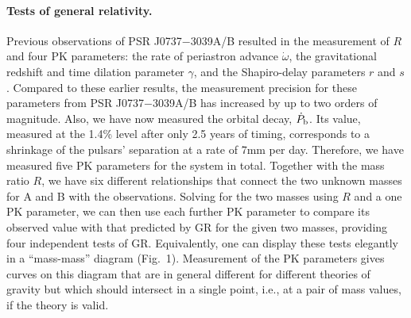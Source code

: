 \documentclass[12pt,psfig]{article}
\begin{document}
\paragraph*{Tests of general relativity.}


Previous observations of PSR J0737$-$3039A/B\cite{bdp+03,lbk+04} resulted in
the measurement of $R$ and four PK parameters: the rate of periastron advance
$\dot{\omega}$, the gravitational redshift and time dilation parameter
$\gamma$, and the Shapiro-delay parameters $r$ and $s$.  Compared to these
earlier results, the measurement precision for these parameters from PSR
J0737$-$3039A/B has increased by up to two orders of magnitude. Also, we have
now measured the orbital decay, $\dot{P}_{\rm b}$. Its value, measured at the
1.4\% level after only 2.5 years of timing, corresponds to a shrinkage of the
pulsars' separation at a rate of 7mm per day. Therefore, we have measured
five PK parameters for the system in total. 
Together with the mass ratio $R$, we have six
different relationships that connect the two unknown masses for A and B with
the observations. Solving for the two masses using $R$ and a one PK parameter,
we can then use each further PK parameter to compare its observed value with
that predicted by GR for the given two masses, providing four independent
tests of GR. Equivalently, one can display these tests elegantly in a
``mass-mass'' diagram (Fig.~1).  Measurement of the PK parameters gives curves
on this diagram that are in general different for different theories of
gravity but which should intersect in a single point, i.e., at a pair of mass
values, if the theory is valid\cite{dt92}.
\end{document}
